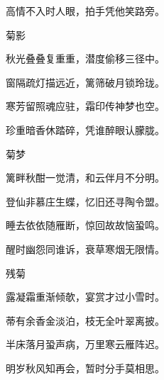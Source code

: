 \begin{poem}
    \begin{pl}高情不入时人眼，拍手凭他笑路旁。\end{pl}
    \emptypl

    \begin{pl}菊影　\end{pl}

    \begin{pl}秋光叠叠复重重，潜度偷移三径中。\end{pl}

    \begin{pl}窗隔疏灯描远近，篱筛破月锁玲珑。\end{pl}

    \begin{pl}寒芳留照魂应驻，霜印传神梦也空。\end{pl}

    \begin{pl}珍重暗香休踏碎，凭谁醉眼认朦胧。\end{pl}
    \emptypl

    \begin{pl}菊梦　\end{pl}

    \begin{pl}篱畔秋酣一觉清，和云伴月不分明。\end{pl}

    \begin{pl}登仙非慕庄生蝶，忆旧还寻陶令盟。\end{pl}

    \begin{pl}睡去依依随雁断，惊回故故恼蛩鸣。\end{pl}

    \begin{pl}醒时幽怨同谁诉，衰草寒烟无限情。\end{pl}
    \emptypl

    \begin{pl}残菊　\end{pl}

    \begin{pl}露凝霜重渐倾欹，宴赏才过小雪时。\end{pl}

    \begin{pl}蒂有余香金淡泊，枝无全叶翠离披。\end{pl}

    \begin{pl}半床落月蛩声病，万里寒云雁阵迟。\end{pl}

    \begin{pl}明岁秋风知再会，暂时分手莫相思。\end{pl}
\end{poem}


